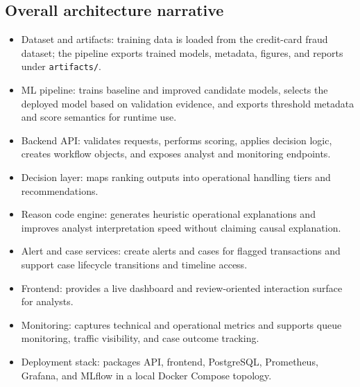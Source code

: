 \documentclass[11pt]{article}
\newcommand{\code}[1]{\texttt{#1}}
\begin{document}
\subsection*{Overall architecture narrative}
\begin{itemize}
  \item Dataset and artifacts: training data is loaded from the credit-card fraud dataset; the pipeline exports trained models, metadata, figures, and reports under \code{artifacts/}.
  \item ML pipeline: trains baseline and improved candidate models, selects the deployed model based on validation evidence, and exports threshold metadata and score semantics for runtime use.
  \item Backend API: validates requests, performs scoring, applies decision logic, creates workflow objects, and exposes analyst and monitoring endpoints.
  \item Decision layer: maps ranking outputs into operational handling tiers and recommendations.
  \item Reason code engine: generates heuristic operational explanations and improves analyst interpretation speed without claiming causal explanation.
  \item Alert and case services: create alerts and cases for flagged transactions and support case lifecycle transitions and timeline access.
  \item Frontend: provides a live dashboard and review-oriented interaction surface for analysts.
  \item Monitoring: captures technical and operational metrics and supports queue monitoring, traffic visibility, and case outcome tracking.
  \item Deployment stack: packages API, frontend, PostgreSQL, Prometheus, Grafana, and MLflow in a local Docker Compose topology.
\end{itemize}
\end{document}
